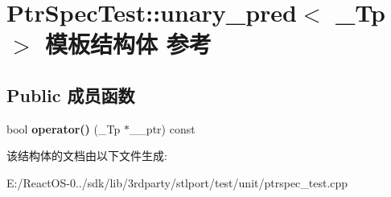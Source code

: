 \hypertarget{struct_ptr_spec_test_1_1unary__pred}{}\section{Ptr\+Spec\+Test\+:\+:unary\+\_\+pred$<$ \+\_\+\+Tp $>$ 模板结构体 参考}
\label{struct_ptr_spec_test_1_1unary__pred}
\subsection*{Public 成员函数}
\begin{DoxyCompactItemize}
\item 
\mbox{\label{struct_ptr_spec_test_1_1unary__pred_a2a1b3d76e4206464db2ff449d30b1dd7}} 
bool {\bfseries operator()} (\+\_\+\+Tp $\ast$\+\_\+\+\_\+ptr) const
\end{DoxyCompactItemize}


该结构体的文档由以下文件生成\+:\begin{DoxyCompactItemize}
\item 
E\+:/\+React\+O\+S-\/0../sdk/lib/3rdparty/stlport/test/unit/ptrspec\+\_\+test.\+cpp\end{DoxyCompactItemize}
